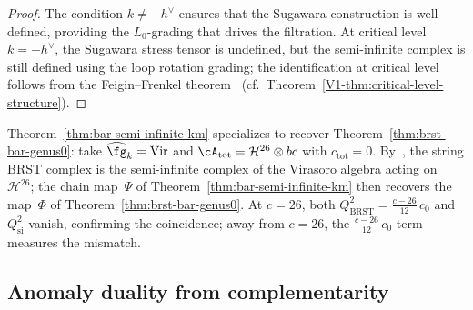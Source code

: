 \begin{proof}
The condition $k \neq -h^\vee$ ensures that the Sugawara
construction is well-defined, providing the $L_0$-grading
that drives the filtration. At critical level
$k = -h^\vee$, the Sugawara stress tensor is undefined, but the
semi-infinite complex is still defined using the loop rotation
grading; the identification at critical level follows from the
Feigin--Frenkel theorem~\cite{Feigin-Frenkel}
(cf.\ Theorem~\ref{V1-thm:critical-level-structure}).
\end{proof}

\begin{remark}
\label{rem:string-brst-special-case}
Theorem~\ref{thm:bar-semi-infinite-km} specializes to recover
Theorem~\ref{thm:brst-bar-genus0}: take $\widehat{\fg}_k = \mathrm{Vir}$
and $\cA_{\mathrm{tot}} = \mathcal{H}^{26} \otimes bc$ with
$c_{\mathrm{tot}} = 0$. By~\cite{FGZ86}, the string BRST complex is the
semi-infinite complex of the Virasoro algebra acting on~$\mathcal{H}^{26}$;
the chain map~$\Psi$ of Theorem~\ref{thm:bar-semi-infinite-km} then recovers
the map~$\Phi$ of Theorem~\ref{thm:brst-bar-genus0}. At $c = 26$, both
$Q_{\mathrm{BRST}}^2 = \frac{c-26}{12}\,c_0$ and $Q_{\mathrm{si}}^2$
vanish, confirming the coincidence; away from $c = 26$, the
$\frac{c-26}{12}\,c_0$ term measures the mismatch.
\end{remark}

\subsection{Anomaly duality from complementarity}

